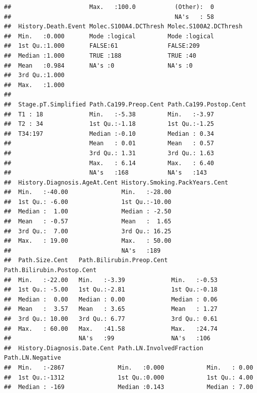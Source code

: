 \documentclass{article}\usepackage[]{graphicx}\usepackage[]{color}
\makeatletter
\newenvironment{kframe}{%
 \def\at@end@of@kframe{}%
 \ifinner\ifhmode%
  \def\at@end@of@kframe{\end{minipage}}%
  \begin{minipage}{\columnwidth}%
 \fi\fi%
 \def\FrameCommand##1{\hskip\@totalleftmargin \hskip-\fboxsep
 \colorbox{shadecolor}{##1}\hskip-\fboxsep
     \hskip-\linewidth \hskip-\@totalleftmargin \hskip\columnwidth}%
 \MakeFramed {\advance\hsize-\width
   \@totalleftmargin\z@ \linewidth\hsize
   \@setminipage}}%
 {\par\unskip\endMakeFramed%
 \at@end@of@kframe}
\newenvironment{knitrout}{}{} %
\makeatother
\begin{document}
\begin{knitrout}
\begin{kframe}
\begin{verbatim}
##                      Max.   :100.0           (Other):  0  
##                                              NA's   : 58  
##  History.Death.Event Molec.S100A4.DCThresh Molec.S100A2.DCThresh
##  Min.   :0.000       Mode :logical         Mode :logical        
##  1st Qu.:1.000       FALSE:61              FALSE:209            
##  Median :1.000       TRUE :188             TRUE :40             
##  Mean   :0.984       NA's :0               NA's :0              
##  3rd Qu.:1.000                                                  
##  Max.   :1.000                                                  
##                                                                 
##  Stage.pT.Simplified Path.Ca199.Preop.Cent Path.Ca199.Postop.Cent
##  T1 : 18             Min.   :-5.38         Min.   :-3.97         
##  T2 : 34             1st Qu.:-1.18         1st Qu.:-1.25         
##  T34:197             Median :-0.10         Median : 0.34         
##                      Mean   : 0.01         Mean   : 0.57         
##                      3rd Qu.: 1.31         3rd Qu.: 1.63         
##                      Max.   : 6.14         Max.   : 6.40         
##                      NA's   :168           NA's   :143           
##  History.Diagnosis.AgeAt.Cent History.Smoking.PackYears.Cent
##  Min.   :-40.00               Min.   :-28.00                
##  1st Qu.: -6.00               1st Qu.:-10.00                
##  Median :  1.00               Median : -2.50                
##  Mean   : -0.57               Mean   :  1.65                
##  3rd Qu.:  7.00               3rd Qu.: 16.25                
##  Max.   : 19.00               Max.   : 50.00                
##                               NA's   :189                   
##  Path.Size.Cent   Path.Bilirubin.Preop.Cent Path.Bilirubin.Postop.Cent
##  Min.   :-22.00   Min.   :-3.39             Min.   :-0.53             
##  1st Qu.: -5.00   1st Qu.:-2.81             1st Qu.:-0.18             
##  Median :  0.00   Median : 0.00             Median : 0.06             
##  Mean   :  3.57   Mean   : 3.65             Mean   : 1.27             
##  3rd Qu.: 10.00   3rd Qu.: 6.77             3rd Qu.: 0.61             
##  Max.   : 60.00   Max.   :41.58             Max.   :24.74             
##                   NA's   :99                NA's   :106               
##  History.Diagnosis.Date.Cent Path.LN.InvolvedFraction Path.LN.Negative
##  Min.   :-2867               Min.   :0.000            Min.   : 0.00   
##  1st Qu.:-1312               1st Qu.:0.000            1st Qu.: 4.00   
##  Median : -169               Median :0.143            Median : 7.00   

\end{verbatim}
\end{kframe}
\end{knitrout}
\end{document}
